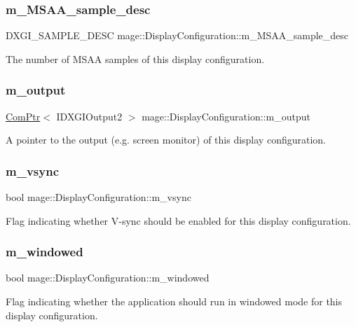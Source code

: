 \subsubsection{\texorpdfstring{m\+\_\+\+M\+S\+A\+A\+\_\+sample\+\_\+desc}{m\_MSAA\_sample\_desc}}
{\footnotesize\ttfamily D\+X\+G\+I\+\_\+\+S\+A\+M\+P\+L\+E\+\_\+\+D\+E\+SC mage\+::\+Display\+Configuration\+::m\+\_\+\+M\+S\+A\+A\+\_\+sample\+\_\+desc\hspace{0.3cm}{\ttfamily [private]}}

The number of M\+S\+AA samples of this display configuration. \hypertarget{structmage_1_1_display_configuration_a483b3b999f4736084daa819a15adfb80}{}\label{structmage_1_1_display_configuration_a483b3b999f4736084daa819a15adfb80} 
\subsubsection{\texorpdfstring{m\+\_\+output}{m\_output}}
{\footnotesize\ttfamily \hyperlink{namespacemage_ae74f374780900893caa5555d1031fd79}{Com\+Ptr}$<$ I\+D\+X\+G\+I\+Output2 $>$ mage\+::\+Display\+Configuration\+::m\+\_\+output\hspace{0.3cm}{\ttfamily [private]}}

A pointer to the output (e.\+g. screen monitor) of this display configuration. \hypertarget{structmage_1_1_display_configuration_a22dd3b35e58260c9555a37aef0e85a4d}{}\label{structmage_1_1_display_configuration_a22dd3b35e58260c9555a37aef0e85a4d} 
\subsubsection{\texorpdfstring{m\+\_\+vsync}{m\_vsync}}
{\footnotesize\ttfamily bool mage\+::\+Display\+Configuration\+::m\+\_\+vsync\hspace{0.3cm}{\ttfamily [private]}}

Flag indicating whether V-\/sync should be enabled for this display configuration. \hypertarget{structmage_1_1_display_configuration_a0c447e4bd7ea72313315c657e9cd0d95}{}\label{structmage_1_1_display_configuration_a0c447e4bd7ea72313315c657e9cd0d95} 
\subsubsection{\texorpdfstring{m\+\_\+windowed}{m\_windowed}}
{\footnotesize\ttfamily bool mage\+::\+Display\+Configuration\+::m\+\_\+windowed\hspace{0.3cm}{\ttfamily [private]}}

Flag indicating whether the application should run in windowed mode for this display configuration. 